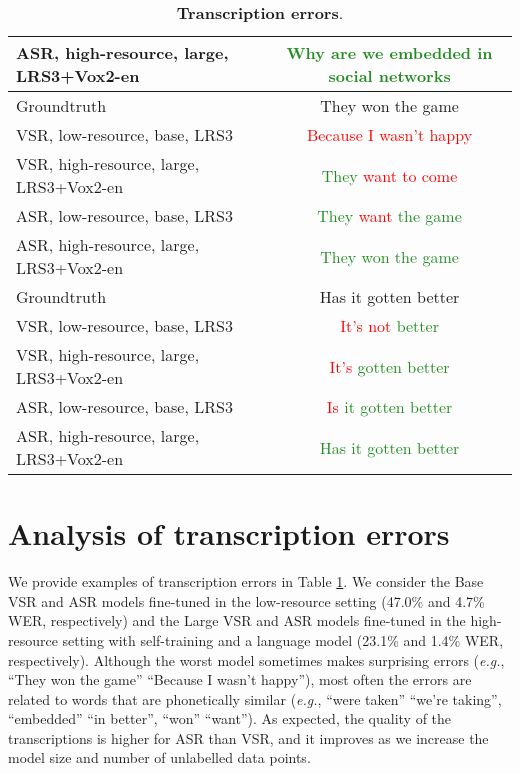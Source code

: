 \documentclass{article} \usepackage{iclr2023_conference,times}
\begin{document}
\begin{table}
{\begin{tabular}[b]{l c}
ASR, high-resource, large, LRS3+Vox2-en & \textcolor{ForestGreen}{Why are we embedded in social networks} \\
\midrule
Groundtruth & They won the game \\
VSR, low-resource, base, LRS3 & \textcolor{red}{Because I wasn't happy} \\
VSR, high-resource, large, LRS3+Vox2-en & \textcolor{ForestGreen}{They} \textcolor{red}{want to come} \\
ASR, low-resource, base, LRS3 & \textcolor{ForestGreen}{They} \textcolor{red}{want} \textcolor{ForestGreen}{the game} \\
ASR, high-resource, large, LRS3+Vox2-en & \textcolor{ForestGreen}{They won the game} \\
\midrule
Groundtruth & Has it gotten better \\
VSR, low-resource, base, LRS3 & \textcolor{red}{It's not} \textcolor{ForestGreen}{better} \\
VSR, high-resource, large, LRS3+Vox2-en & \textcolor{red}{It's} \textcolor{ForestGreen}{gotten better} \\
ASR, low-resource, base, LRS3 & \textcolor{red}{Is} \textcolor{ForestGreen}{it gotten better} \\
ASR, high-resource, large, LRS3+Vox2-en & \textcolor{ForestGreen}{Has it gotten better} \\
\bottomrule 
\end{tabular}
}
\caption{\textbf{Transcription errors}.}
\label{table:transcriptions}
\end{table}

\section{Analysis of transcription errors}
We provide examples of transcription errors in Table \ref{table:transcriptions}. We consider the Base VSR and ASR models fine-tuned in the low-resource setting (47.0\% and 4.7\% WER, respectively) and the Large VSR and ASR models fine-tuned in the high-resource setting with self-training and a language model (23.1\% and 1.4\% WER, respectively). Although the worst model sometimes makes surprising errors (\textit{e.g.}, ``They won the game''  ``Because I wasn't happy''), most often the errors are related to words that are phonetically similar (\textit{e.g.}, ``were taken''  ``we're taking'', ``embedded''  ``in better'', ``won''  ``want''). As expected, the quality of the transcriptions is higher for ASR than VSR, and it improves as we increase the model size and number of unlabelled data points.  
\end{document}
